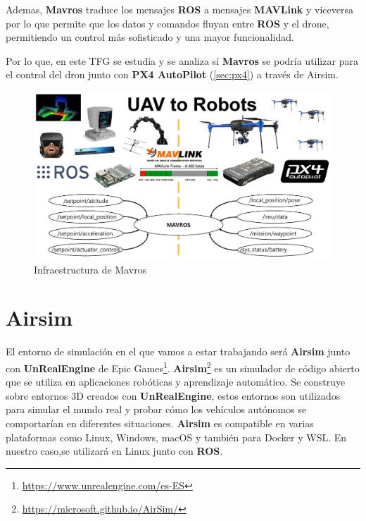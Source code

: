 Ademas, \textbf{Mavros} traduce los mensajes \textbf{ROS} a mensajes \textbf{MAVLink} y viceversa por lo que permite que los datos y comandos fluyan entre \textbf{ROS} y el drone, 
permitiendo un control más sofisticado y una mayor funcionalidad. 

Por lo que, en este TFG se estudia y se analiza sí \textbf{Mavros} se podría utilizar para el control del dron junto con \textbf{PX4 AutoPilot} (\ref{sec:px4}) a través
de Airsim. 

\begin{figure} [H]
  \begin{center}
    \includegraphics[scale=0.3]{figs/Plataformas_Desarollo/mavros.jpg}
  \end{center}
  \caption{Infraestructura de Mavros}
  \label{fig:InfraROS}
  \vspace{-1.5em}
\end{figure}

\section{Airsim}
\label{sec:Airsim}
El entorno de simulación en el que vamos a estar trabajando será \textbf{Airsim} junto con \textbf{UnRealEngine} de Epic Games\footnote{\url{https://www.unrealengine.com/es-ES}}. \textbf{Airsim}\footnote{\url{https://microsoft.github.io/AirSim/}} es un simulador de código abierto que se utiliza en aplicaciones robóticas 
y aprendizaje automático.
Se construye sobre entornos 3D creados con \textbf{UnRealEngine}, estos entornos son utilizados para simular el mundo real y probar 
cómo los vehículos autónomos se comportarían en diferentes situaciones. \textbf{Airsim} es compatible en varias plataformas como Linux, Windows, macOS y también para Docker y WSL. En nuestro caso,se utilizará en Linux junto
con \textbf{ROS}. 

